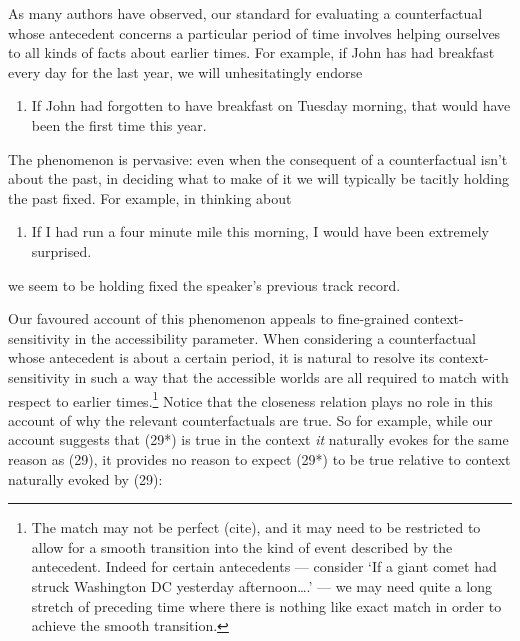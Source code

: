 As many authors have observed, our standard for evaluating a
counterfactual whose antecedent concerns a particular period of time
involves helping ourselves to all kinds of facts about earlier times.
For example, if John has had breakfast every day for the last year, we
will unhesitatingly endorse

\begin{enumerate}
\def\labelenumi{(\arabic{enumi})}
\setcounter{enumi}{37}
\itemsep1pt\parskip0pt
\item
  If John had forgotten to have breakfast on Tuesday morning, that would
  have been the first time this year.
\end{enumerate}

The phenomenon is pervasive: even when the consequent of a
counterfactual isn't about the past, in deciding what to make of it we
will typically be tacitly holding the past fixed. For example, in
thinking about

\begin{enumerate}
\def\labelenumi{(\arabic{enumi})}
\setcounter{enumi}{38}
\itemsep1pt\parskip0pt
\item
  If I had run a four minute mile this morning, I would have been
  extremely surprised.
\end{enumerate}

we seem to be holding fixed the speaker's previous track record.

Our favoured account of this phenomenon appeals to fine-grained
context-sensitivity in the accessibility parameter. When considering a
counterfactual whose antecedent is about a certain period, it is natural
to resolve its context-sensitivity in such a way that the accessible
worlds are all required to match with respect to earlier
times.\footnote{The match may not be perfect (cite), and it may need to
  be restricted to allow for a smooth transition into the kind of event
  described by the antecedent. Indeed for certain antecedents ---
  consider `If a giant comet had struck Washington DC yesterday
  afternoon\ldots{}.' --- we may need quite a long stretch of preceding
  time where there is nothing like exact match in order to achieve the
  smooth transition.} Notice that the closeness relation plays no role
in this account of why the relevant counterfactuals are true. So for
example, while our account suggests that (29*) is true in the context
\emph{it} naturally evokes for the same reason as (29), it provides no
reason to expect (29*) to be true relative to context naturally evoked
by (29):

